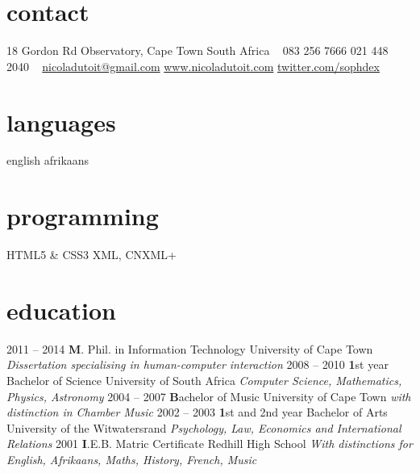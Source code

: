 \documentclass[]{friggeri-cv} %
\begin{document}


\begin{aside} %
\section{contact}
18 Gordon Rd
Observatory, Cape Town
South Africa
~
083 256 7666
021 448 2040
~
\href{mailto:nicoladutoit@gmail.com}{nicoladutoit@gmail.com}
\href{http://www.nicoladutoit.com}{www.nicoladutoit.com}
\href{https://twitter.com/sophdex}{twitter.com/sophdex}
\section{languages}
english 
afrikaans
\section{programming}
HTML5 \& CSS3
XML, CNXML+
\end{aside}


\section{education}

\begin{entrylist}
\entry
{2011 -- 2014}
{\textbf M. Phil. in Information Technology}
{University of Cape Town}
{\emph{Dissertation specialising in human-computer interaction}}
\entry
{2008 -- 2010}
{\textbf 1st year Bachelor of Science}
{University of South Africa}
{\emph{Computer Science, Mathematics, Physics, Astronomy}}
\entry
{2004 -- 2007}
{\textbf Bachelor of Music}
{University of Cape Town}
{\emph{with distinction in Chamber Music}}
\entry
{2002 -- 2003}
{\textbf 1st and 2nd year Bachelor of Arts}
{University of the Witwatersrand}
{\emph{Psychology, Law, Economics and International Relations}}
\entry
{2001}
{\textbf I.E.B. Matric Certificate }
{Redhill High School}
{\emph{With distinctions for English, Afrikaans, Maths, History, French, Music}}

\end{entrylist}
\end{document}
